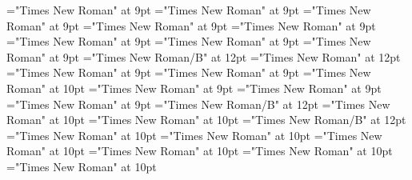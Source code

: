 \documentclass[gps1,twoside]{article}
\begin{document}
\font\spanspanreverseabbrcomplexformtypecomplexformtypescomplexformsnotsubentrycomplexformsnotsubentriessubentrysubentriesentrybefore="Times New Roman" at 9pt
\font\spanspanheadwordcomplexformsnotsubentrycomplexformsnotsubentriessubentrysubentriesentrybefore="Times New Roman" at 9pt
\font\spanspanowningentrysummarydefinitioncomplexformsnotsubentrycomplexformsnotsubentriessubentrysubentriesentrybefore="Times New Roman" at 9pt
\font\spanowningentrysummarydefinitioncomplexformsnotsubentrycomplexformsnotsubentriessubentrysubentriesentryfirstchildbefore="Times New Roman" at 9pt
\font\spanowningentrysummarydefinitioncomplexformsnotsubentrycomplexformsnotsubentriessubentrysubentriesentrylastchildafter="Times New Roman" at 9pt
\font\nontrivialentryrootnontrivialentryrootnontrivialentryrootscomplexformsnotsubentrycomplexformsnotsubentriessubentrysubentriesentrybefore="Times New Roman" at 9pt
\font\nontrivialentryrootscomplexformsnotsubentrycomplexformsnotsubentriessubentrysubentriesentrybefore="Times New Roman" at 9pt
\font\nontrivialentryrootscomplexformsnotsubentrycomplexformsnotsubentriessubentrysubentriesentryafter="Times New Roman" at 9pt
\font\nontrivialentryrootnontrivialentryrootscomplexformsnotsubentrycomplexformsnotsubentriessubentrysubentriesentry="Times New Roman/B" at 12pt
\font\picturepicturessubentrysubentriesentry="Times New Roman" at 12pt
\font\spanspanpicturessubentrysubentriesentrybefore="Times New Roman" at 9pt
\font\picturessubentrysubentriesentryafter="Times New Roman" at 9pt
\font\picturepicturessubentrysubentriesentry="Times New Roman" at 10pt
\font\picturepicturessubentrysubentriesentryafter="Times New Roman" at 9pt
\font\spanspancaptionpicturepicturessubentrysubentriesentrybefore="Times New Roman" at 9pt
\font\subentriessubentrysubentriesentryafter="Times New Roman" at 9pt
\font\spanbzhheadwordminorentrycomplex="Times New Roman/B" at 12pt
\font\spanspanheadwordminorentrycomplexbefore="Times New Roman" at 10pt
\font\spanheadwordminorentrycomplexlastchildafter="Times New Roman" at 10pt
\font\spanheadwordminorentrycomplex="Times New Roman/B" at 12pt
\font\pronunciationpronunciationpronunciationsminorentrycomplexbefore="Times New Roman" at 10pt
\font\pronunciationsminorentrycomplexafter="Times New Roman" at 10pt
\font\spanspanformpronunciationpronunciationsminorentrycomplexbefore="Times New Roman" at 10pt
\font\spanformpronunciationpronunciationsminorentrycomplexfirstchildbefore="Times New Roman" at 10pt
\font\spanformpronunciationpronunciationsminorentrycomplexlastchildafter="Times New Roman" at 10pt
\font\spanspanvariantformentrybackrefsminorentrycomplexbefore="Times New Roman" at 10pt
\end{document}
